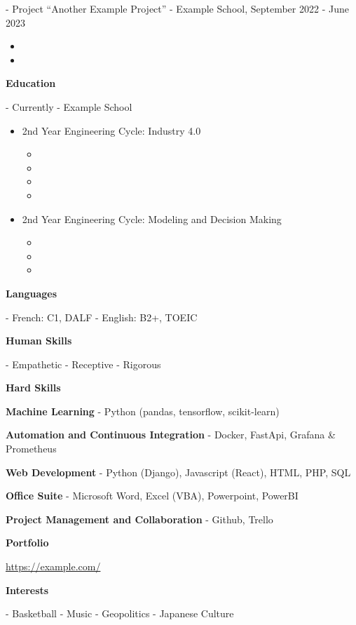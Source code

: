 \documentclass[11pt]{article}
\newcommand{\subsectiontitle}[1]{\noindent\textbf{#1}}
\newcommand{\website}[1]{\href{#1}{#1}}
\begin{document}
\begin{multicols}{2}
- Project “Another Example Project” - Example School, September 2022 - June 2023
\begin{itemize}[topsep=0pt, partopsep=0pt, parsep=0pt, leftmargin=1.2cm]
    \item \lipsum[15]
    \item \lipsum[16]
\end{itemize}

\subsectiontitle{Education}

- Currently - Example School
\begin{itemize}[topsep=0pt, partopsep=0pt, parsep=0pt, leftmargin=1.2cm]
    \item 2nd Year Engineering Cycle: Industry 4.0
        \begin{itemize}[topsep=0pt, partopsep=0pt, parsep=0pt]
            \item \lipsum[17]
            \item \lipsum[18]
            \item \lipsum[19]
            \item \lipsum[20]
        \end{itemize}

    \item 2nd Year Engineering Cycle: Modeling and Decision Making
        \begin{itemize}[topsep=0pt, partopsep=0pt, parsep=0pt]
            \item \lipsum[21]
            \item \lipsum[22]
            \item \lipsum[23]
        \end{itemize}
\end{itemize}

\subsectiontitle{Languages}

- French: C1, DALF
- English: B2+, TOEIC

\subsectiontitle{Human Skills}

- Empathetic
- Receptive
- Rigorous

\subsectiontitle{Hard Skills}

\textbf{Machine Learning}
- Python (pandas, tensorflow, scikit-learn)

\textbf{Automation and Continuous Integration}
- Docker, FastApi, Grafana & Prometheus

\textbf{Web Development}
- Python (Django), Javascript (React), HTML, PHP, SQL

\textbf{Office Suite}
- Microsoft Word, Excel (VBA), Powerpoint, PowerBI

\textbf{Project Management and Collaboration}
- Github, Trello

\subsectiontitle{Portfolio}

\website{https://example.com/}

\subsectiontitle{Interests}

- Basketball
- Music
- Geopolitics
- Japanese Culture

\end{multicols}
\end{document}
